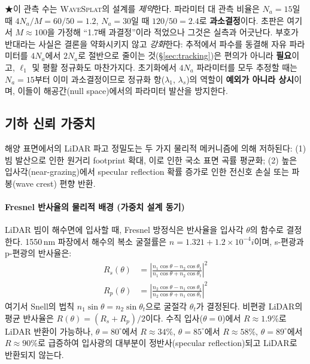 \documentclass[11pt]{report}
\numberwithin{equation}{chapter}
\numberwithin{figure}{chapter}
\numberwithin{table}{chapter}
\newcommand{\WS}{\textsc{WaveSplat}}
\begin{document}
★이 관측 수는 \WS{}의 설계를 \emph{제약}한다. 파라미터 대 관측 비율은
$N_a = 15$일 때 $4N_a / M = 60/50 = 1.2$, $N_a = 30$일 때 $120/50 = 2.4$로
\textbf{과소결정}이다. 초판은 여기서 $M \approx 100$을 가정해 ``1.7배 과결정''이라
적었으나 그것은 실측과 어긋난다. 부호가 반대라는 사실은 결론을 약화시키지 않고
\emph{강화}한다: 추적에서 파수를 동결해 자유 파라미터를 $4N_a$에서 $2N_a$로 절반으로
줄이는 것(\S\ref{sec:tracking})은 편의가 아니라 \textbf{필요}이고,
$\ell_1$ 및 평활 정규화도 마찬가지다.
초기화에서 $4N_a$ 파라미터를 모두 추정할 때는 $N_a = 15$부터 이미 과소결정이므로
정규화 항($\lambda_1$, $\lambda_s$)의 역할이 \textbf{예외가 아니라 상시}이며,
이들이 해공간(null space)에서의 파라미터 발산을 방지한다.

\subsection{기하 신뢰 가중치}
\label{sec:geom_confidence}

해양 표면에서의 LiDAR 파고 정밀도는 두 가지 물리적 메커니즘에 의해 저하된다:
(1) 빔 발산으로 인한 원거리 footprint 확대, 이로 인한 국소 표면 곡률 평균화;
(2) 높은 입사각(near-grazing)에서 specular reflection 확률 증가로 인한
전신호 손실 또는 파봉(wave crest) 편향 반환.

\paragraph{Fresnel 반사율의 물리적 배경 (가중치 설계 동기)}
LiDAR 빔이 해수면에 입사할 때, Fresnel 방정식은 반사율을 입사각 $\theta$의
함수로 결정한다. 1550\,nm 파장에서 해수의 복소 굴절률은
$n = 1.321 + 1.2\times10^{-4}i$이며, s-편광과 p-편광의 반사율은:
\begin{align}
  R_s(\theta) &= \left|\frac{n_1\cos\theta - n_2\cos\theta_t}{n_1\cos\theta + n_2\cos\theta_t}\right|^2 \\
  R_p(\theta) &= \left|\frac{n_2\cos\theta - n_1\cos\theta_t}{n_2\cos\theta + n_1\cos\theta_t}\right|^2
\end{align}
여기서 Snell의 법칙 $n_1\sin\theta = n_2\sin\theta_t$으로
굴절각 $\theta_t$가 결정된다.
비편광 LiDAR의 평균 반사율은 $R(\theta) = (R_s + R_p)/2$이다.
수직 입사($\theta=0$)에서 $R \approx 1.9\%$로 LiDAR 반환이 가능하나,
$\theta=80^\circ$에서 $R\approx 34\%$, $\theta=85^\circ$에서 $R\approx 58\%$,
$\theta=89^\circ$에서 $R\approx 90\%$로 급증하여
입사광의 대부분이 정반사(specular reflection)되고 LiDAR로 반환되지 않는다.
\end{document}

